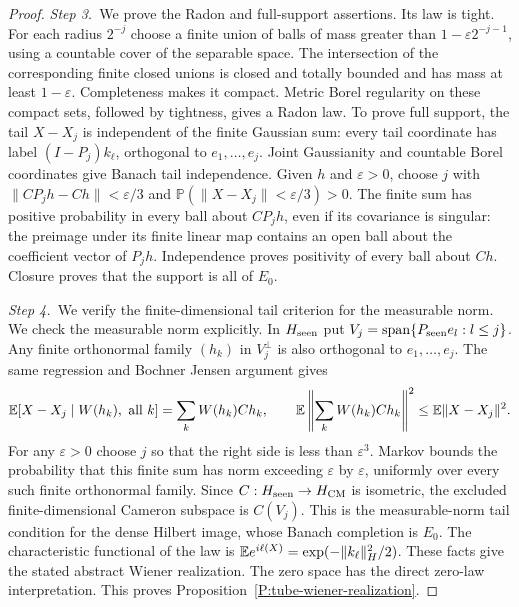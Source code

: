 \begin{proof}
  \medskip
  \noindent\textit{Step 3.~}We prove the Radon and full-support assertions.
  Its law is tight. For each radius $2^{-j}$ choose a finite union of balls of
  mass greater than $1-\varepsilon2^{-j-1}$, using a countable cover of the
  separable space. The intersection of the corresponding finite closed unions is
  closed and totally bounded and has mass at least $1-\varepsilon$. Completeness
  makes it compact. Metric Borel regularity on these compact sets, followed by
  tightness, gives a Radon law. To prove full support, the tail $X-X_j$ is
  independent of the finite Gaussian sum: every tail coordinate has label
  $(I-P_j)k_\ell$, orthogonal to $e_1,\ldots,e_j$. Joint Gaussianity and
  countable Borel coordinates give Banach tail independence. Given $h$ and
  $\varepsilon > 0$, choose $j$ with $\|CP_jh-Ch\| < \varepsilon/3$ and
  $\mathbb{P}(\|X-X_j\| < \varepsilon/3) > 0$. The finite sum has positive
  probability in every ball about $CP_jh$, even if its covariance is singular:
  the preimage under its finite linear map contains an open ball about the
  coefficient vector of $P_jh$. Independence proves positivity of every ball
  about $Ch$. Closure proves that the support is all of $E_0$.


  \medskip
  \noindent\textit{Step 4.~}We verify the finite-dimensional tail criterion
  for the measurable norm.
  We check the measurable norm explicitly. In $H_{\rm seen}$ put $V_j =
  \operatorname{span}\{P_{\rm seen}e_l:l\le j\}$. Any finite orthonormal family
  $(h_k)$ in $V_j^\perp$ is also orthogonal to $e_1,\ldots,e_j$. The same
  regression and Bochner Jensen argument gives
  \[
    \mathbb{E}[X-X_j\mid W(h_k),\hbox{ all }k]
    =\sum_k W(h_k)Ch_k,\qquad
    \mathbb{E}\left\|\sum_kW(h_k)Ch_k\right\|^2
    \le\mathbb{E}\|X-X_j\|^2 .
  \]
  For any $\varepsilon > 0$ choose $j$ so that the right side is less than
  $\varepsilon^3$. Markov bounds the probability that this finite sum has norm
  exceeding $\varepsilon$ by $\varepsilon$, uniformly over every such finite
  orthonormal family. Since $C:H_{\rm seen} \to H_{\rm CM}$ is isometric, the
  excluded finite-dimensional Cameron subspace is $C(V_j)$. This is the
  measurable-norm tail condition for the dense Hilbert image, whose Banach
  completion is $E_0$. The characteristic functional of the law is $\mathbb{E}
  e^{i\ell(X)} = \exp(-\|k_\ell\|_H^2/2)$. These facts give the stated abstract
  Wiener realization. The zero space has the direct zero-law interpretation.
  This proves Proposition~\ref{P:tube-wiener-realization}.
\end{proof}

